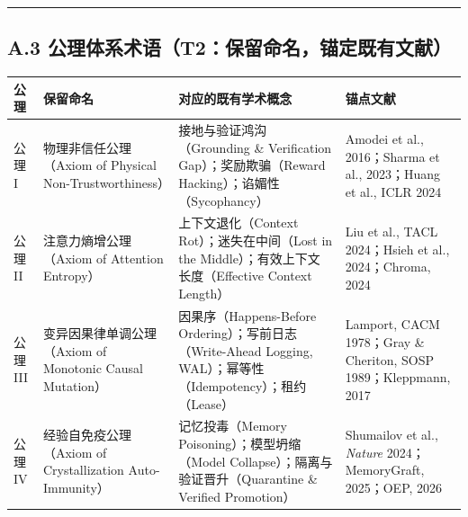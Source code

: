 \begin{center}\rule{0.5\linewidth}{0.5pt}\end{center}

\subsection{A.3
公理体系术语（T2：保留命名，锚定既有文献）}\label{a.3-ux516cux7406ux4f53ux7cfbux672fux8bedt2ux4fddux7559ux547dux540dux951aux5b9aux65e2ux6709ux6587ux732e}

{\def\LTcaptype{} %
\begin{longtable}[]{@{}
  >{\raggedright\arraybackslash}p{}
  >{\raggedright\arraybackslash}p{}
  >{\raggedright\arraybackslash}p{}
  >{\raggedright\arraybackslash}p{}@{}}
\toprule\noalign{}
\begin{minipage}[b]{\linewidth}\raggedright
公理
\end{minipage} & \begin{minipage}[b]{\linewidth}\raggedright
保留命名
\end{minipage} & \begin{minipage}[b]{\linewidth}\raggedright
对应的既有学术概念
\end{minipage} & \begin{minipage}[b]{\linewidth}\raggedright
锚点文献
\end{minipage} \\
\midrule\noalign{}
\endhead
\bottomrule\noalign{}
\endlastfoot
公理 I & 物理非信任公理（Axiom of Physical Non-Trustworthiness） &
接地与验证鸿沟（Grounding \& Verification Gap）；奖励欺骗（Reward
Hacking）；谄媚性（Sycophancy） & Amodei et al., 2016；Sharma et al.,
2023；Huang et al., ICLR 2024 \\
公理 II & 注意力熵增公理（Axiom of Attention Entropy） &
上下文退化（Context Rot）；迷失在中间（Lost in the
Middle）；有效上下文长度（Effective Context Length） & Liu et al., TACL
2024；Hsieh et al., 2024；Chroma, 2024 \\
公理 III & 变异因果律单调公理（Axiom of Monotonic Causal Mutation） &
因果序（Happens-Before Ordering）；写前日志（Write-Ahead Logging,
WAL）；幂等性（Idempotency）；租约（Lease） & Lamport, CACM 1978；Gray
\& Cheriton, SOSP 1989；Kleppmann, 2017 \\
公理 IV & 经验自免疫公理（Axiom of Crystallization Auto-Immunity） &
记忆投毒（Memory Poisoning）；模型坍缩（Model
Collapse）；隔离与验证晋升（Quarantine \& Verified Promotion） &
Shumailov et al., \emph{Nature} 2024；MemoryGraft, 2025；OEP, 2026 \\
\end{longtable}
}

